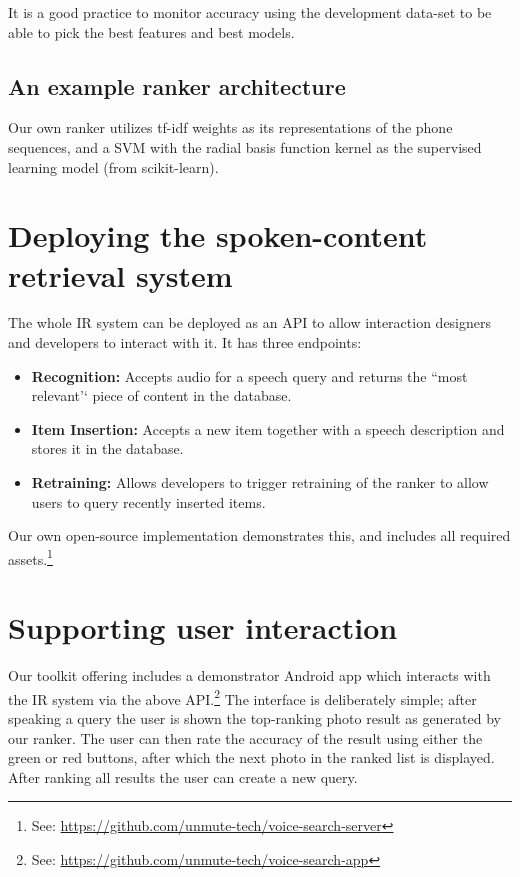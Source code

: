 \documentclass[10pt,twoside,openright]{report}
\begin{document}
It is a good practice to monitor accuracy using the development data-set to be able to pick the best features and best models.

\vspace{-1em}
\begin{unmutehighlight}
\section*{An example ranker architecture}
    Our own ranker utilizes tf-idf weights as its representations of the phone sequences, and a SVM with the radial basis function kernel as the supervised learning model (from scikit-learn).
\end{unmutehighlight}


\section{Deploying the spoken-content retrieval system}
The whole IR system can be deployed as an API to allow interaction designers and developers to interact with it.
It has three endpoints:

\begin{itemize}
    \item \textbf{Recognition:} Accepts audio for a speech query and returns the ``most relevant'` piece of content in the database.
    \item \textbf{Item Insertion:} Accepts a new item together with a speech description and stores it in the database.
    \item \textbf{Retraining:} Allows developers to trigger retraining of the ranker to allow users to query recently inserted items. 
\end{itemize}

Our own open-source implementation demonstrates this, and includes all required assets.\footnote{See: \url{https://github.com/unmute-tech/voice-search-server}}


\section{Supporting user interaction}
Our toolkit offering includes a demonstrator Android app which interacts with the IR system via the above API.\footnote{See: \url{https://github.com/unmute-tech/voice-search-app}}
The interface is deliberately simple; after speaking a query the user is shown the top-ranking photo result as generated by our ranker.
The user can then rate the accuracy of the result using either the green or red buttons, after which the next photo in the ranked list is displayed.
After ranking all results the user can create a new query.
\end{document}
